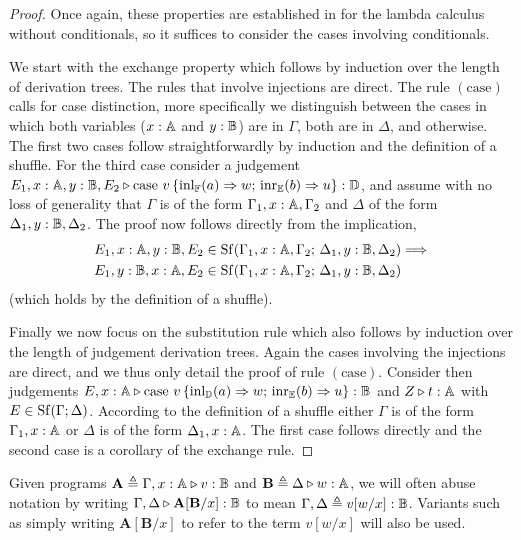 \begin{proof}
  Once again, these properties are established in \cite[Theorem 2.1]{dahlqvist2023syntactic} for the lambda calculus without conditionals, so it suffices to consider the cases involving conditionals.

  We start with the exchange property which follows by induction over the length
of derivation trees. The rules that involve injections are direct.  The rule
$(\text{case})$ calls for case distinction, more specifically we  distinguish
between the cases in which both variables ($x : \mathbb{A}$ and $y : \mathbb{B}$) are
in $\Gamma$, both are in $\Delta$, and otherwise. The first two cases follow
straightforwardly by induction and the definition of a shuffle. For the third
case consider a judgement $E_1,x : \mathbb{A}, y : \mathbb{B}, E_2 \triangleright \text{case }
v\, \{\mathrm{inl}_{\mathbb{F}}(a) \Rightarrow w ; \, \mathrm{inr}_{\mathbb{E}}(b) \Rightarrow u \}:
\mathbb{D}$, and assume with no loss of generality that $\Gamma$ is of the form
$\Gamma_1, x : \mathbb{A}, \Gamma_2$ and $\Delta$ of the form $\Delta_1, y :
\mathbb{B}, \Delta_2$. The proof now follows directly from the implication,
\begin{align*}
        & E_1, x : \mathbb{A}, y : \mathbb{B}, E_2 \in \mathrm{Sf}(\Gamma_1, x : \mathbb{A}, \Gamma_2 ; \,
        \Delta_1, y : \mathbb{B}, \Delta_2) \Longrightarrow  \\
        &
        E_1, y : \mathbb{B}, x : \mathbb{A}, E_2 \in \mathrm{Sf}(\Gamma_1, x : \mathbb{A}, \Gamma_2 ; \,
        \Delta_1, y : \mathbb{B}, \Delta_2)
\end{align*}
(which holds by the definition of a shuffle).

Finally we now focus on the substitution rule which also follows by induction over the
length of judgement derivation trees. Again the cases involving the injections are direct,
and we thus only detail the proof of rule $(\text{case})$. Consider then
judgements $E,x : \mathbb{A} \triangleright \text{case } v\, \{\mathrm{inl}_{\mathbb{D}}(a) \Rightarrow
w ; \, \mathrm{inr}_{\mathbb{E}}(b) \Rightarrow u \}: \mathbb{B}$ and
$Z \triangleright t : \mathbb{A}$ with $E \in \mathrm{Sf}(\Gamma; \Delta)$. According to the definition
of a shuffle either $\Gamma$ is of the form $\Gamma_1, x: \mathbb{A}$ or $\Delta$ is
of the form $\Delta_1, x : \mathbb{A}$. The first case follows directly and the second case
is a corollary of the exchange rule.
\end{proof}

\begin{convention}
  Given programs  $\textbf{A} \triangleq \Gamma, x:\mathbb{A} \triangleright v:\mathbb{B}$ and $\textbf{B} \triangleq \Delta \triangleright w:\mathbb{A}$, we will often abuse notation by writing $\Gamma,\Delta \triangleright \textbf{A} [\textbf{B}/x]:\mathbb{B}$ to mean $\Gamma,\Delta \triangleq v[w/x]:\mathbb{B}$. Variants such as simply writing $\textbf{A}[\textbf{B}/x]$ to refer to the term $v[w/x]$ will also be used.
\end{convention}

